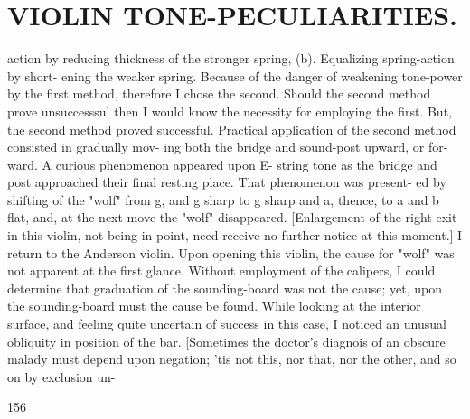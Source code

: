 \documentclass{article}
\begin{document}
\section*{VIOLIN TONE-PECULIARITIES.}
action by reducing thickness of the stronger spring, (b). Equalizing spring-action by short- ening the weaker spring. Because of the danger of weakening tone-power by the first method, therefore I chose the second. Should the second method prove unsuccesssul then I would know the necessity for employing the first. But, the second method proved successful. Practical application of the second method consisted in gradually mov- ing both the bridge and sound-post upward, or for- ward. A curious phenomenon appeared upon E- string tone as the bridge and post approached their final resting place. That phenomenon was present- ed by shifting of the "wolf" from g, and g sharp to g sharp and a, thence, to a and b flat, and, at the next move the "wolf" disappeared. [Enlargement of the right exit in this violin, not being in point, need receive no further notice at this moment.] I return to the Anderson violin. Upon opening this violin, the cause for "wolf" was not apparent at the first glance. Without employment of the calipers, I could determine that graduation of the sounding-board was not the cause; yet, upon the sounding-board must the cause be found. While looking at the interior surface, and feeling quite uncertain of success in this case, I noticed an unusual obliquity in position of the bar. [Sometimes the doctor's diagnois of an obscure malady must depend upon negation; 'tis not this, nor that, nor the other, and so on by exclusion un-

156
\end{document}
